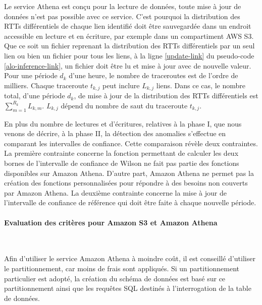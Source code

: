 Le service Athena est conçu pour la lecture de données, toute mise à jour de données n'est pas possible avec ce service. C'est pourquoi la distribution des RTTs différentiels de chaque  lien identifié doit être sauvegardée dans un endroit accessible en lecture et en écriture, par exemple dans un compartiment AWS S3. Que ce soit un fichier reprenant la distribution des RTTs différentiels  par un seul lien ou bien un fichier pour tous les liens,   à la ligne  \ref{update-link} du pseudo-code \ref{alo-inference-link}, un fichier doit être lu et mise à jour avec de nouvelle valeur. Pour une période $d_k$ d'une heure, le nombre de traceroutes est de l'ordre de milliers. Chaque traceroute $t_{k,j}$ peut inclure $L_{k,j}$ liens. Dans ce cas, le nombre total, d'une période $d_k$, de mise à jour de la distribution des RTTs différentiels est    $ \sum_{m=1}^{R_k}  L_{k,m}$. $ L_{k,j} $ dépend du nombre de saut du  traceroute $t_{k,j}$.


En plus du nombre de lectures et d'écritures, relatives à la phase I, que nous venons de décrire, à la phase II, la détection des anomalies s'effectue en  comparant les intervalles de confiance. Cette comparaison révèle deux contraintes. La première contrainte concerne  la fonction permettant de calculer les deux bornes de l'intervalle de confiance de Wilson ne fait pas partie des fonctions disponibles sur Amazon Athena. D'autre part, Amazon Athena ne permet pas la création des fonctions personnalisées pour répondre à des besoins non couverts par Amazon Athena. La deuxième contrainte concerne la mise à jour de l'intervalle de confiance de référence qui doit être faite à chaque nouvelle période.


\paragraph{Evaluation des critères pour Amazon S3 et Amazon Athena  }~

Afin d'utiliser le service Amazon Athena à moindre coût, il est conseillé d'utiliser le partitionnement, car moins de frais sont appliqués. Si un partitionnement particulier est adopté, la création du schéma de données est basé sur ce partitionnement ainsi que les requêtes SQL destinés à l'interrogation de la table de données.

